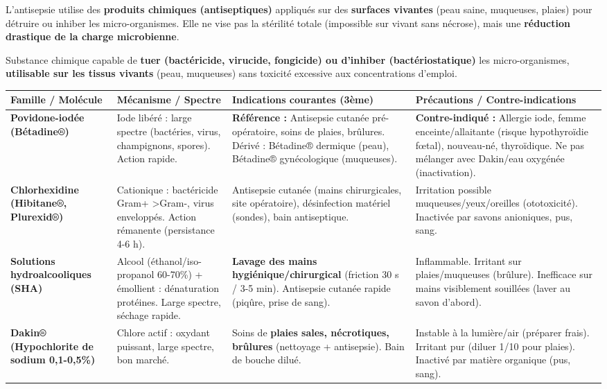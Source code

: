 \documentclass[11pt]{article}
\begin{document}
L'antisepsie utilise des \textbf{produits chimiques (antiseptiques)} appliqués sur des \textbf{surfaces vivantes} (peau saine, muqueuses, plaies) pour détruire ou inhiber les micro-organismes. Elle ne vise pas la stérilité totale (impossible sur vivant sans nécrose), mais une \textbf{réduction drastique de la charge microbienne}.

\begin{definition}[Antiseptique]
Substance chimique capable de \textbf{tuer (bactéricide, virucide, fongicide) ou d'inhiber (bactériostatique)} les micro-organismes, \textbf{utilisable sur les tissus vivants} (peau, muqueuses) sans toxicité excessive aux concentrations d'emploi.
\end{definition}

\begin{center}
\begin{tabularx}{\linewidth}{|l|X|X|X|}\hline
\textbf{Famille / Molécule} & \textbf{Mécanisme / Spectre} & \textbf{Indications courantes (3ème)} & \textbf{Précautions / Contre-indications} \\ \hline
\textbf{Povidone-iodée (Bétadine®)} & Iode libéré : large spectre (bactéries, virus, champignons, spores). Action rapide. & \textbf{Référence :} Antisepsie cutanée pré-opératoire, soins de plaies, brûlures. Dérivé : Bétadine® dermique (peau), Bétadine® gynécologique (muqueuses). & \textbf{Contre-indiqué :} Allergie iode, femme enceinte/allaitante (risque hypothyroïdie fœtal), nouveau-né, thyroïdique. Ne pas mélanger avec Dakin/eau oxygénée (inactivation). \\ \hline
\textbf{Chlorhexidine (Hibitane®, Plurexid®)} & Cationique : bactéricide Gram+ \textgreater Gram-, virus enveloppés. Action rémanente (persistance 4-6 h). & Antisepsie cutanée (mains chirurgicales, site opératoire), désinfection matériel (sondes), bain antiseptique. & Irritation possible muqueuses/yeux/oreilles (ototoxicité). Inactivée par savons anioniques, pus, sang. \\ \hline
\textbf{Solutions hydroalcooliques (SHA)} & Alcool (éthanol/iso-propanol 60-70\%) + émollient : dénaturation protéines. Large spectre, séchage rapide. & \textbf{Lavage des mains hygiénique/chirurgical} (friction 30 s / 3-5 min). Antisepsie cutanée rapide (piqûre, prise de sang). & Inflammable. Irritant sur plaies/muqueuses (brûlure). Inefficace sur mains visiblement souillées (laver au savon d'abord). \\ \hline
\textbf{Dakin® (Hypochlorite de sodium 0,1-0,5\%)} & Chlore actif : oxydant puissant, large spectre, bon marché. & Soins de \textbf{plaies sales, nécrotiques, brûlures} (nettoyage + antisepsie). Bain de bouche dilué. & Instable à la lumière/air (préparer frais). Irritant pur (diluer 1/10 pour plaies). Inactivé par matière organique (pus, sang). \\ \hline

\end{tabularx}
\end{center}
\end{document}
